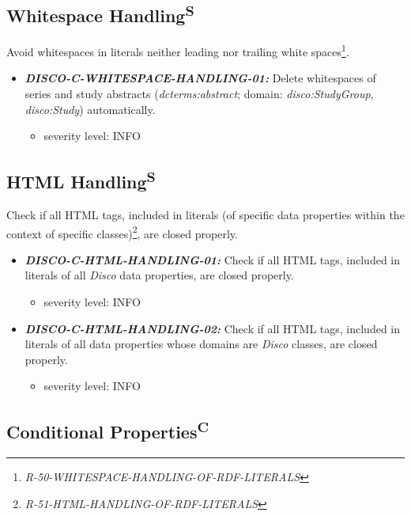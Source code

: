 \documentclass{llncs}
\begin{document}
\subsection{Whitespace Handling\textsuperscript{S}}

Avoid whitespaces in literals neither leading nor trailing white spaces\footnote{\emph{R-50-WHITESPACE-HANDLING-OF-RDF-LITERALS}}.

\begin{itemize}
	\item \textbf{{\em DISCO-C-WHITESPACE-HANDLING-01:}} Delete whitespaces of series and study abstracts (\emph{dcterms:abstract}; domain: \emph{disco:StudyGroup}, \emph{disco:Study}) automatically.
	\begin{itemize}
		\item severity level: INFO
	\end{itemize}
\end{itemize}

\subsection{HTML Handling\textsuperscript{S}}

Check if all HTML tags, included in literals (of specific data properties within the context of specific classes)\footnote{\emph{R-51-HTML-HANDLING-OF-RDF-LITERALS}}, are closed properly.

\begin{itemize}
	\item \textbf{{\em DISCO-C-HTML-HANDLING-01:}} Check if all HTML tags, included in literals of all \emph{Disco} data properties, are closed properly.
		\begin{itemize}
		\item severity level: INFO
	\end{itemize}
	\item \textbf{{\em DISCO-C-HTML-HANDLING-02:}} Check if all HTML tags, included in literals of all data properties whose domains are \emph{Disco} classes, are closed properly.
		\begin{itemize}
		\item severity level: INFO
	\end{itemize}
\end{itemize}


\subsection{Conditional Properties\textsuperscript{C}}
\end{document}
